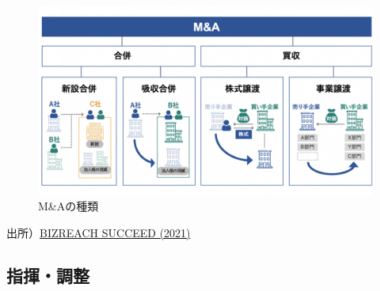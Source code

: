 \documentclass[
]{book}
\begin{document}
\begin{figure}
\includegraphics[width=960px]{ma} \caption{M&Aの種類}\label{fig:ma}
\end{figure}

出所）\href{https://br-succeed.jp/content/knowledge/post-1598}{BIZREACH SUCCEED (2021)}

\hypertarget{us-command}{%
\subsection{指揮・調整}\label{us-command}}
\end{document}
